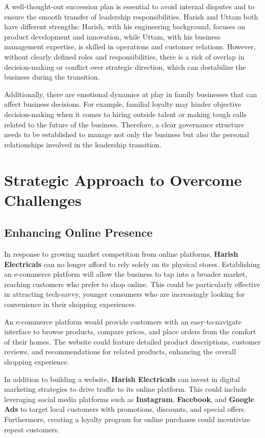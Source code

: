 \documentclass[a4paper,12pt]{report}
\begin{document}
A well-thought-out succession plan is essential to avoid internal disputes and to ensure the smooth transfer of leadership responsibilities. Harish and Uttam both have different strengths: Harish, with his engineering background, focuses on product development and innovation, while Uttam, with his business management expertise, is skilled in operations and customer relations. However, without clearly defined roles and responsibilities, there is a risk of overlap in decision-making or conflict over strategic direction, which can destabilize the business during the transition.

Additionally, there are emotional dynamics at play in family businesses that can affect business decisions. For example, familial loyalty may hinder objective decision-making when it comes to hiring outside talent or making tough calls related to the future of the business. Therefore, a clear governance structure needs to be established to manage not only the business but also the personal relationships involved in the leadership transition.

\chapter{Strategic Approach to Overcome Challenges}

\section{Enhancing Online Presence}
In response to growing market competition from online platforms, \textbf{Harish Electricals} can no longer afford to rely solely on its physical stores. Establishing an e-commerce platform will allow the business to tap into a broader market, reaching customers who prefer to shop online. This could be particularly effective in attracting tech-savvy, younger consumers who are increasingly looking for convenience in their shopping experiences.

An e-commerce platform would provide customers with an easy-to-navigate interface to browse products, compare prices, and place orders from the comfort of their homes. The website could feature detailed product descriptions, customer reviews, and recommendations for related products, enhancing the overall shopping experience.

In addition to building a website, \textbf{Harish Electricals} can invest in digital marketing strategies to drive traffic to its online platform. This could include leveraging social media platforms such as \textbf{Instagram}, \textbf{Facebook}, and \textbf{Google Ads} to target local customers with promotions, discounts, and special offers. Furthermore, creating a loyalty program for online purchases could incentivize repeat customers.
\end{document}
